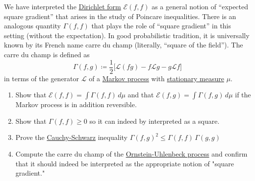   \begin{exercise}
  We have interpreted the \hyperref[def:dirichlet-form]{Dirichlet form} $\mathcal{E}(f, f)$ as a general notion of ``expected square gradient'' that arises in the study of Poincare inequalities. There is an analogous quantity $\Gamma(f, f)$ that plays the role of ``square gradient'' in this setting (without the expectation). In good probabilistic tradition, it is universally known by its French name carre du champ (literally, ``square of the field''). The carre du champ is defined as
  \begin{equation}
    \Gamma(f, g) \coloneqq \frac{1}{2} \big[ \mathscr{L}(f g) - f \mathscr{L} g - g \mathscr{L} f \big]
  \end{equation}
  in terms of the generator $\mathscr{L}$ of a \hyperref[def:markov-process]{Markov process} with \hyperref[def:stationary-measure]{stationary measure} $\mu$. 
  \begin{enumerate}
      \item Show that $\mathcal{E}(f, f) = \int \Gamma(f, f) \, d\mu$ and that $\mathcal{E}(f, g) = \int \Gamma(f, g) \,d\mu$ if the Markov process is in addition reversible. 
      \item Show that $\Gamma(f, f) \geq 0$ so it can indeed by interpreted as a square. 
      \item Prove the \hyperref[mt-thm:cauchy-schwarz]{Cauchy-Schwarz} inequality $\Gamma(f, g)^2 \leq \Gamma(f, f) \, \Gamma(g, g)$ 
      \item Compute the carre du champ of the \hyperref[def:ornstein-uhlenbeck-process]{Ornstein-Uhlenbeck process} and confirm that it should indeed be interpreted as the appropriate notion of "square gradient." 
  \end{enumerate}
  \end{exercise}
